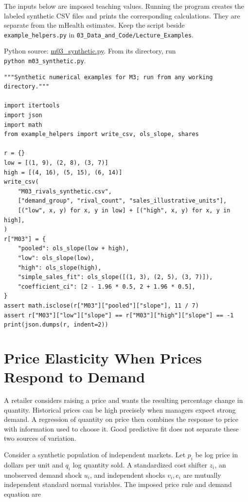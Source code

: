 \noindent The inputs below are imposed teaching values. Running the program
creates the labeled synthetic CSV files and prints the corresponding
calculations. They are separate from the mHealth estimates. Keep the
script beside \texttt{example\_helpers.py} in
\texttt{03\_Data\_and\_Code/Lecture\_Examples}.

\FloatBarrier
{}
Python source:
\href{../03_Data_and_Code/Lecture_Examples/m03_synthetic.py}{m03\_synthetic.py}.
From its directory, run \texttt{python\ m03\_synthetic.py}.

\begin{Verbatim}[breaklines,breakanywhere,fontsize=\small]
"""Synthetic numerical examples for M3; run from any working directory."""

import itertools
import json
import math
from example_helpers import write_csv, ols_slope, shares

r = {}
low = [(1, 9), (2, 8), (3, 7)]
high = [(4, 16), (5, 15), (6, 14)]
write_csv(
    "M03_rivals_synthetic.csv",
    ["demand_group", "rival_count", "sales_illustrative_units"],
    [("low", x, y) for x, y in low] + [("high", x, y) for x, y in high],
)
r["M03"] = {
    "pooled": ols_slope(low + high),
    "low": ols_slope(low),
    "high": ols_slope(high),
    "simple_sales_fit": ols_slope([(1, 3), (2, 5), (3, 7)]),
    "coefficient_ci": [2 - 1.96 * 0.5, 2 + 1.96 * 0.5],
}
assert math.isclose(r["M03"]["pooled"]["slope"], 11 / 7)
assert r["M03"]["low"]["slope"] == r["M03"]["high"]["slope"] == -1
print(json.dumps(r, indent=2))
\end{Verbatim}

\hypertarget{M03-price-elasticity-when-prices-respond-to-demand}{%
\section{Price Elasticity When Prices Respond to
Demand}\label{M03-price-elasticity-when-prices-respond-to-demand}}

\noindent A retailer considers raising a price and wants the resulting percentage
change in quantity. Historical prices can be high precisely when
managers expect strong demand. A regression of quantity on price then
combines the response to price with information used to choose it. Good
predictive fit does not separate these two sources of variation.

Consider a synthetic population of independent markets. Let \(p_i\) be
log price in dollars per unit and \(q_i\) log quantity sold. A
standardized cost shifter \(z_i\), an unobserved demand shock \(u_i\),
and independent shocks \(v_i,e_i\) are mutually independent standard
normal variables. The imposed price rule and demand equation are

